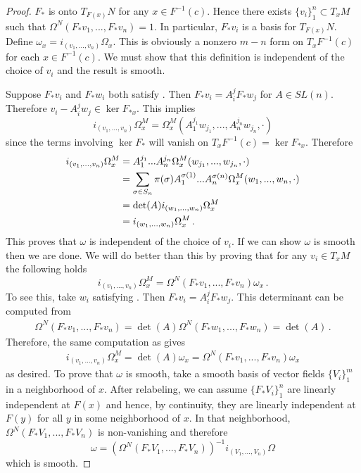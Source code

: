 \begin{proof}
$F_*$ is onto $T_{F(x)}N$ for any $x\in F^{-1}(c)$.  Hence there exists $\{v_i\}_1^n\subset T_xM$ such that $\Omega^N(F_*v_1,...,F_* v_n)=1$.  In particular, $F_* v_i$ is a basis for $T_{F(x)} N$.  Define $\omega_x=i_{(v_1,...,v_n)}\Omega_x$. This is obviously a nonzero $m-n$ form on $T_xF^{-1}(c)$ for each $x\in F^{-1}(c)$.  We must show that this definition is independent of the choice of $v_i$ and the result is smooth.

 Suppose $F_*v_i$ and $F_*w_i$ both satisfy .  Then $F_*v_i=A_i^jF_*w_j$ for $A\in SL(n)$. Therefore $v_i-A_i^jw_j\in \ker F_{*x}$.  This implies
\begin{equation}
i_{(v_1,...,v_n)}\Omega^M_x=\Omega^M_x(A_1^{j_1}w_{j_1},...,A_n^{j_n}w_{j_n},\cdot)
\end{equation}
since the terms involving $\ker F_*$ will vanish on $T_x F^{-1}(c)=\ker F_{*x}$.  Therefore
\begin{align}\label{ind_of_v_proof}
i_{(v_1,...,v_n)}\Omega^M_x&=A_1^{j_1}...A_n^{j_n}\Omega^M_x(w_{j_1},...,w_{j_n},\cdot)\\
&=\sum_{\sigma\in S_n} \pi(\sigma)A_1^{\sigma(1)}...A_n^{\sigma(n)}\Omega^M_x(w_1,...,w_n,\cdot)\notag\\
&=\det(A)i_{(w_1,...,w_n)}\Omega^M_x\notag\\
&=i_{(w_1,...,w_n)}\Omega^M_x\,.\notag
\end{align}
This proves that $\omega$ is independent of the choice of $v_i$.  If we can show $\omega$ is smooth then we are done.  We will do better than this by proving that for any  $v_i\in T_xM$ the following holds
\begin{equation}
i_{(v_1,...,v_n)}\Omega^M_x=\Omega^N(F_*v_1,...,F_*v_n)\omega_x\,.
\end{equation}
To see this, take $w_i$ satisfying .  Then $F_*v_i=A_i^j F_*w_j$. This determinant can be computed from
\begin{align}
\Omega^N(F_*v_1,...,F_*v_n)=\det(A)\Omega^N(F_*w_1,...,F_*w_n)=\det(A)\,.
\end{align}
 Therefore, the same computation as  gives
\begin{align}
i_{(v_1,...,v_n)}\Omega^M_x=\det(A)\omega_x=\Omega^N(F_*v_1,...,F_*v_n)\omega_x
\end{align}
as desired.  To prove that $\omega$ is smooth, take a smooth basis of vector fields $\{V_i\}_1^m$ in a neighborhood of $x$.  After relabeling, we can assume $\{F_*V_i\}_1^n$ are linearly independent at $F(x)$ and hence, by continuity, they are linearly independent at $F(y)$ for all $y$ in some neighborhood of $x$.  In that neighborhood, $\Omega^N(F_*V_1,...,F_*V_n)$ is non-vanishing and therefore
\begin{equation}
\omega=(\Omega^N(F_*V_1,...,F_*V_n))^{-1}i_{(V_1,...,V_n)}\Omega
\end{equation} 
which is smooth.
\end{proof}


